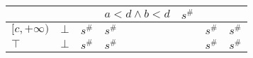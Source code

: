 \documentclass{article}
\begin{document}
\begin{table}[]
{\begin{tabular}{|l|l|ll|ll|ll|l|}
                                    &                         &                          &                                    & $a< d \land b < d$    & $s^\#$                       &                          &                                               &                                                     \\ \hline
    $[c, +\infty)$                  & $\bot$                  & \multicolumn{2}{l|}{$s^\#$}                                   & \multicolumn{2}{l|}{$s^\#$}                          & \multicolumn{2}{l|}{$s^\#$}                                              & $s^\#$                                              \\ \hline
    $\top$                          & $\bot$                  & \multicolumn{2}{l|}{$s^\#$}                                   & \multicolumn{2}{l|}{$s^\#$}                          & \multicolumn{2}{l|}{$s^\#$}                                              & $s^\#$                                              \\ \hline
    \end{tabular}}
    \end{table}
\end{document}
